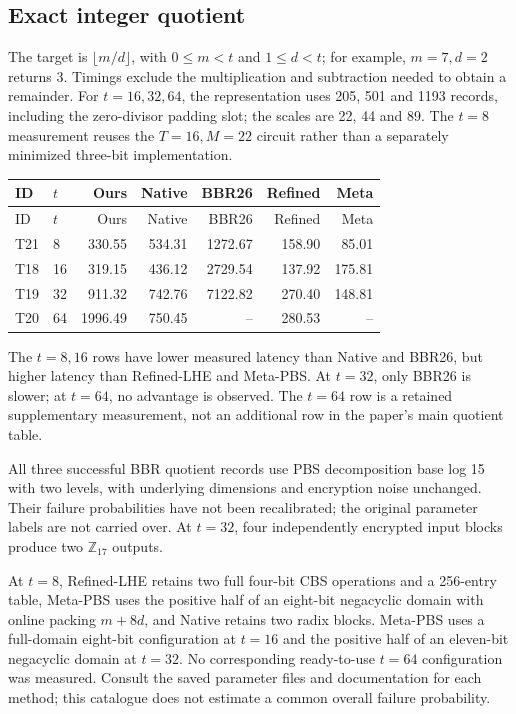 \documentclass[a4paper,10pt]{article}
\begin{document}
\subsection{Exact integer quotient}
The target is $\lfloor m/d\rfloor$, with $0\le m<t$ and $1\le d<t$; for example, $m=7,d=2$ returns 3. Timings exclude the multiplication and subtraction needed to obtain a remainder. For $t=16,32,64$, the representation uses 205, 501 and 1193 records, including the zero-divisor padding slot; the scales are 22, 44 and 89. The $t=8$ measurement reuses the $T=16,M=22$ circuit rather than a separately minimized three-bit implementation.

\begin{longtable}{@{}llrrrrr@{}}
\toprule
ID & $t$ & Ours & Native & BBR26 & Refined & Meta\\\midrule
\endfirsthead
\toprule
ID & $t$ & Ours & Native & BBR26 & Refined & Meta\\\midrule
\endhead
T21 & 8 & 330.55 & 534.31 & 1272.67 & 158.90 & 85.01\\
T18 & 16 & 319.15 & 436.12 & 2729.54 & 137.92 & 175.81\\
T19 & 32 & 911.32 & 742.76 & 7122.82 & 270.40 & 148.81\\
T20 & 64 & 1996.49 & 750.45 & -- & 280.53 & --\\
\bottomrule\end{longtable}

The $t=8,16$ rows have lower measured latency than Native and BBR26, but higher latency than Refined-LHE and Meta-PBS. At $t=32$, only BBR26 is slower; at $t=64$, no advantage is observed. The $t=64$ row is a retained supplementary measurement, not an additional row in the paper's main quotient table.

All three successful BBR quotient records use PBS decomposition base log 15 with two levels, with underlying dimensions and encryption noise unchanged. Their failure probabilities have not been recalibrated; the original parameter labels are not carried over. At $t=32$, four independently encrypted input blocks produce two $\mathbb Z_{17}$ outputs.

At $t=8$, Refined-LHE retains two full four-bit CBS operations and a 256-entry table, Meta-PBS uses the positive half of an eight-bit negacyclic domain with online packing $m+8d$, and Native retains two radix blocks. Meta-PBS uses a full-domain eight-bit configuration at $t=16$ and the positive half of an eleven-bit negacyclic domain at $t=32$. No corresponding ready-to-use $t=64$ configuration was measured. Consult the saved parameter files and documentation for each method; this catalogue does not estimate a common overall failure probability.
\end{document}
